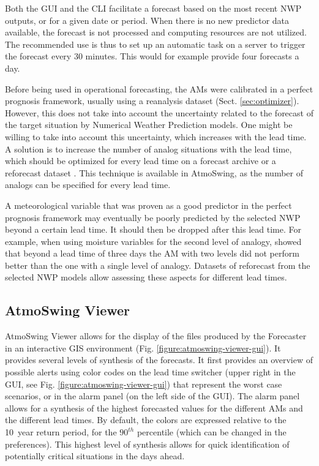 \documentclass[gmd]{copernicus}
\begin{document}
Both the GUI and the CLI facilitate a forecast based on the most recent NWP outputs, or for a given date or period. When there is no new predictor data available, the forecast is not processed and computing resources are not utilized. The recommended use is thus to set up an automatic task on a server to trigger the forecast every 30 minutes. This would for example provide four forecasts a day. 

Before being used in operational forecasting, the AMs were calibrated in a perfect prognosis framework, usually using a reanalysis dataset (Sect. \ref{sec:optimizer}). However, this does not take into account the uncertainty related to the forecast of the target situation by Numerical Weather Prediction models. One might be willing to take into account this uncertainty, which increases with the lead time. A solution is to increase the number of analog situations with the lead time, which should be optimized for every lead time on a forecast archive or a reforecast dataset \citep{Thevenot2004}. This technique is available in AtmoSwing, as the number of analogs can be specified for every lead time.

A meteorological variable that was proven as a good predictor in the perfect prognosis framework may eventually be poorly predicted by the selected NWP beyond a certain lead time. It should then be dropped after this lead time. For example, when using moisture variables for the second level of analogy, \citet{Thevenot2004} showed that beyond a lead time of three days the AM with two levels did not perform better than the one with a single level of analogy. Datasets of reforecast from the selected NWP models allow assessing these aspects for different lead times.


\subsection{AtmoSwing Viewer}
\label{sec:viewer}

AtmoSwing Viewer allows for the display of the files produced by the Forecaster in an interactive GIS environment (Fig. \ref{figure:atmoswing-viewer-gui}). It provides several levels of synthesis of the forecasts. It first provides an overview of possible alerts using color codes on the lead time switcher (upper right in the GUI, see Fig. \ref{figure:atmoswing-viewer-gui}) that represent the worst case scenarios, or in the alarm panel (on the left side of the GUI). The alarm panel allows for a synthesis of the highest forecasted values for the different AMs and the different lead times. By default, the colors are expressed relative to the 10~year return period, for the $90^{th}$ percentile (which can be changed in the preferences). This highest level of synthesis allows for quick identification of potentially critical situations in the days ahead.
\end{document}
